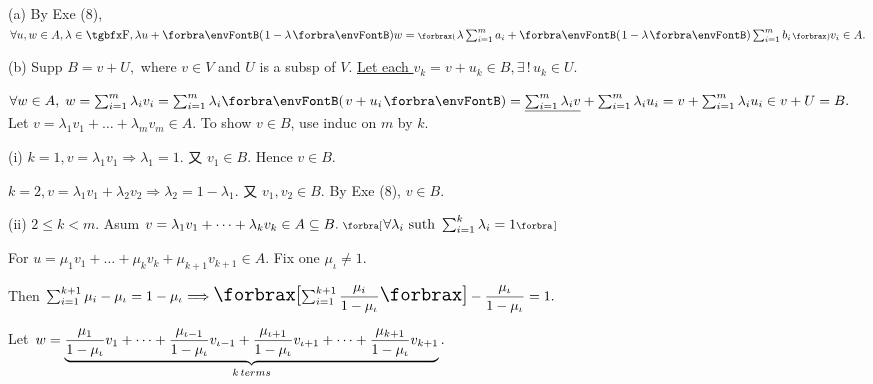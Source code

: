 (a) By Exe (8), $\forall u, w\in A,\lambda\in\Fbb,\lambda u+\Par{1-\lambda}w=\XPar{\lambda\sum_{i=1}^m a_i+\Par{1-\lambda}\sum_{i=1}^m b_i}v_i\in A.$\par\vspace{4pt}\quad
(b) Supp $B=v+U,$ where $v\in V$ and $U$ is a subsp of $V.$ \uline{Let each $v_k=v+u_k\in B,\exists\,!\,u_k\in U.$}\par\vspace{2pt}\quad\Hb
$\forall w\in A,\;w=\sum_{i=1}^m \lambda_i v_i=\sum_{i=1}^m \lambda_i\Par{v+u_i}=\uline{\sum_{i=1}^m \lambda_i v}+\sum_{i=1}^m \lambda_i u_i=v+\sum_{i=1}^m \lambda_i u_i\in v+U=B.$\PfEnd\vspace{6pt}\quad\Hb 
\Or Let $v=\lambda_1 v_1+\dots+\lambda_m v_m\in A$. To show $v\in B$, use induc on $m$ by $k$.\par\quad\Hb
(i) $k=1,v=\lambda_1 v_1\Rightarrow \lambda_1=1.$ 又 $v_1\in B.$ Hence $v\in B$.\par\quad\Hb\Hi
\vspace{4pt}$k=2,v=\lambda_1 v_1+\lambda_2 v_2\Rightarrow\lambda_2=1-\lambda_1.$ 又 $v_1,v_2\in B.$ By Exe (8), $v\in B$.\par\quad\Hb\Endi
(ii) $2\leqslant k<m.$ Asum $v=\lambda_1 v_1+\dots+\lambda_k v_k\in A\subseteq B.\;\Sbra{\forall\lambda_i\text{ suth }\sum_{i=1}^k\lambda_i=1}$\par\quad\Hb\Hii
\vspace{4pt}For $u=\mu_1 v_1+\dots+\mu_k v_k+\mu_{k+1} v_{k+1}\in A.$ \;Fix one $\mu_\iota\neq 1.$\par\quad\Hb\Hii
\vspace{4pt}Then \;$\sum_{i=1}^{k+1}\mu_i-\mu_\iota=1-\mu_\iota\Longrightarrow\envFontLarge\XSbra{{\envFontDefault\sum_{i=1}^{k+1}\Frac{\mu_i}{1-\mu_\iota}}}-\Frac{\mu_\iota}{1-\mu_\iota}=1.$\par\quad\Hb\Hii
\vspace{2pt}Let \,$w=\underbrace{{\displaystyle{\frac{\mu_1}{1-\mu_\iota}}}v_1+\dots+{\displaystyle{\frac{\mu_{\iota-1}}{1-\mu_\iota}}}v_{\iota-1}+{\displaystyle{\frac{\mu_{\iota+1}}{1-\mu_\iota}}}v_{\iota+1}+\dots+{\displaystyle{\frac{\mu_{k+1}}{1-\mu_\iota}}}v_{k+1}}_{k\,terms}.$\par\quad\Hb\Hii
